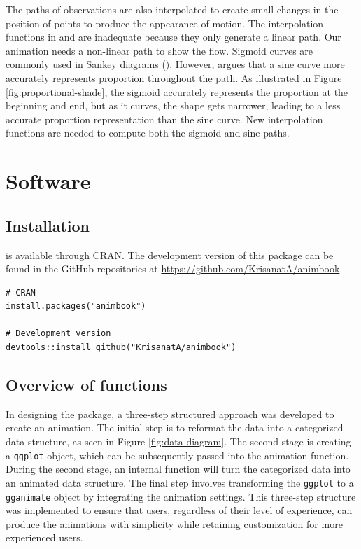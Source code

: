 The paths of observations are also interpolated to create small changes in the position of points to produce the appearance of motion. The interpolation functions in  and  are inadequate because they only generate a linear path. Our animation needs a non-linear path to show the flow. Sigmoid curves are commonly used in Sankey diagrams (\citet{Hvitfeldt_2018}). However, \citet{Shaffer_2019} argues that a sine curve more accurately represents proportion throughout the path. As illustrated in Figure \ref{fig:proportional-shade}, the sigmoid accurately represents the proportion at the beginning and end, but as it curves, the shape gets narrower, leading to a less accurate proportion representation than the sine curve. New interpolation functions are needed to compute both the sigmoid and sine paths.

\section{Software}\label{software}

\subsection{Installation}\label{installation}

 is available through CRAN. The development version of this package can be found in the GitHub repositories at \url{https://github.com/KrisanatA/animbook}.

\begin{verbatim}
# CRAN
install.packages("animbook")

# Development version
devtools::install_github("KrisanatA/animbook")
\end{verbatim}

\subsection{Overview of functions}\label{overview-of-functions}

In designing the  package, a three-step structured approach was developed to create an animation. The initial step is to reformat the data into a categorized data structure, as seen in Figure \ref{fig:data-diagram}. The second stage is creating a \texttt{ggplot} object, which can be subsequently passed into the animation function. During the second stage, an internal function will turn the categorized data into an animated data structure. The final step involves transforming the \texttt{ggplot} to a \texttt{gganimate} object by integrating the animation settings. This three-step structure was implemented to ensure that users, regardless of their level of experience, can produce the animations with simplicity while retaining customization for more experienced users.

